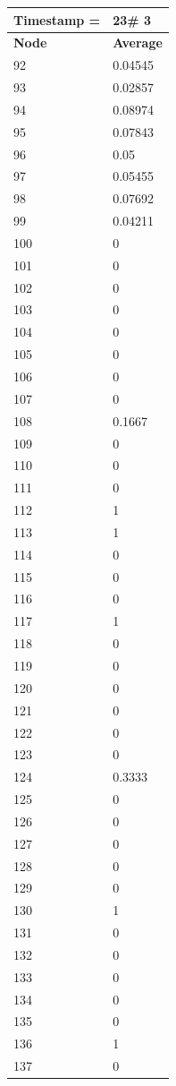 \begin{tabular}{|l||l|}
\hline
\textbf{Timestamp =} & \textbf{23}\# 3\\\hline
	\textbf{Node} & \textbf{Average} \\ \hline
\hline
	92 & 0.04545 \\ \hline
	93 & 0.02857 \\ \hline
	94 & 0.08974 \\ \hline
	95 & 0.07843 \\ \hline
	96 & 0.05 \\ \hline
	97 & 0.05455 \\ \hline
	98 & 0.07692 \\ \hline
	99 & 0.04211 \\ \hline
	100 & 0 \\ \hline
	101 & 0 \\ \hline
	102 & 0 \\ \hline
	103 & 0 \\ \hline
	104 & 0 \\ \hline
	105 & 0 \\ \hline
	106 & 0 \\ \hline
	107 & 0 \\ \hline
	108 & 0.1667 \\ \hline
	109 & 0 \\ \hline
	110 & 0 \\ \hline
	111 & 0 \\ \hline
	112 & 1 \\ \hline
	113 & 1 \\ \hline
	114 & 0 \\ \hline
	115 & 0 \\ \hline
	116 & 0 \\ \hline
	117 & 1 \\ \hline
	118 & 0 \\ \hline
	119 & 0 \\ \hline
	120 & 0 \\ \hline
	121 & 0 \\ \hline
	122 & 0 \\ \hline
	123 & 0 \\ \hline
	124 & 0.3333 \\ \hline
	125 & 0 \\ \hline
	126 & 0 \\ \hline
	127 & 0 \\ \hline
	128 & 0 \\ \hline
	129 & 0 \\ \hline
	130 & 1 \\ \hline
	131 & 0 \\ \hline
	132 & 0 \\ \hline
	133 & 0 \\ \hline
	134 & 0 \\ \hline
	135 & 0 \\ \hline
	136 & 1 \\ \hline
	137 & 0 \\ \hline
\end{tabular}

